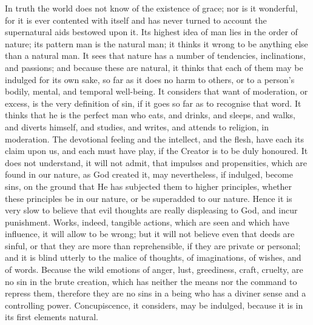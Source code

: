 In truth the world does not know of the existence of grace; nor is
it wonderful, for it is ever contented with itself and has never
turned to account the supernatural aids bestowed upon it. Its highest
idea of man lies in the order of nature; its pattern man is the
natural man; it thinks it wrong to be anything else than a natural
man. It sees that nature has a number of tendencies, inclinations, and
passions; and because these are natural, it thinks that each of them
may be indulged for its own sake, so far as it does no harm to others,
or to a person's bodily, mental, and temporal well-being. It considers
that want of moderation, or excess, is the very definition of sin, if
it goes so far as to recognise that word. It thinks that he is the
perfect man who eats, and drinks, and sleeps, and walks, and diverts
himself, and studies, and writes, and attends to religion, in
moderation. The devotional feeling and the intellect, and the flesh,
have each its claim upon us, and each must have play, if the Creator
is to be duly honoured. It does not understand, it will not admit,
that impulses and propensities, which are found in our nature, as God
created it, may nevertheless, if indulged, become sins, on the ground
that He has subjected them to higher principles, whether these
principles be in our nature, or be superadded to our nature. Hence it
is very slow to believe that evil thoughts are really displeasing to
God, and incur punishment. Works, indeed, tangible actions, which are
seen and which have influence, it will allow to be wrong; but it will
not believe even that deeds are sinful, or that they are more than
reprehensible, if they are private or personal; and it is blind
utterly to the malice of thoughts, of imaginations, of wishes, and of
words. Because the wild emotions of anger, lust, greediness, craft,
cruelty, are no sin in the brute creation, which has neither the means
nor the command to repress them, therefore they are no sins in a being
who has a diviner sense and a controlling power. Concupiscence, it
considers, may be indulged, because it is in its first elements
natural.

